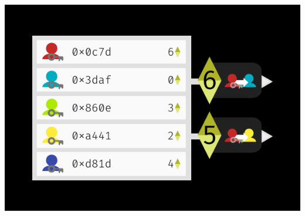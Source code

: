 \documentclass[xcolor=x11names,compress]{beamer}
\begin{document}
\begin{frame}
\begin{overprint}
\begin{center}
			\includegraphics[width=\textwidth,height=0.8\textheight,keepaspectratio]{img/state/04.pdf}
		\end{center}
	\end{overprint}
\end{frame}
\end{document}
